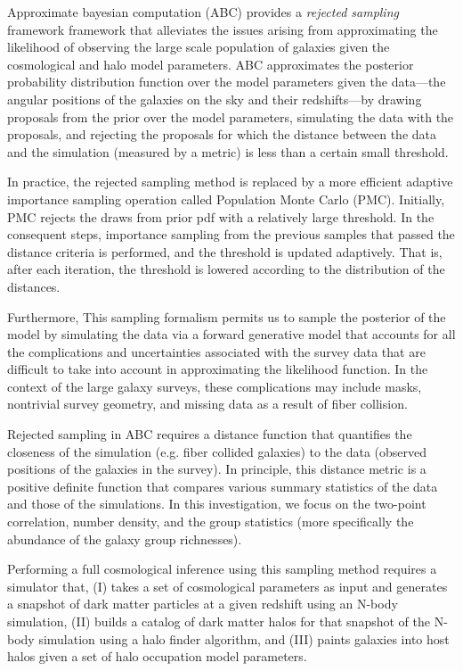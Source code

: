 Approximate bayesian computation (ABC) provides a \emph{rejected sampling} framework framework that alleviates the issues arising from approximating the likelihood of observing the large scale population of galaxies given the cosmological and halo model parameters. ABC approximates the posterior probability distribution function over the model parameters given the data---the angular positions of the galaxies on the sky and their redshifts---by drawing proposals from the prior over the model parameters, simulating the data with the proposals, and rejecting the proposals for which the distance between the data and the simulation (measured by a metric) is less than a certain small threshold.

In practice, the rejected sampling method is replaced by a more efficient adaptive importance sampling operation called Population Monte Carlo (PMC). Initially, PMC rejects the draws from prior pdf with a relatively large threshold. In the consequent steps, importance sampling from the previous samples that passed the distance criteria is performed, and the threshold is updated adaptively. That is, after each iteration, the threshold is lowered according to the distribution of the distances.  
 
Furthermore, This sampling formalism permits us to sample the posterior of the model by simulating the data via a forward generative model that accounts for all the complications and uncertainties associated with the survey data that are difficult to take into account in approximating the likelihood function. In the context of the large galaxy surveys, these complications may include masks, nontrivial survey geometry, and missing data as a result of fiber collision.

Rejected sampling in ABC requires a distance function that quantifies the closeness of the simulation (e.g. fiber collided galaxies) to the data (observed positions of the galaxies in the survey). In principle, this distance metric is a positive definite function  that compares various summary statistics of the data and those of the simulations. In this investigation, we focus on the two-point correlation, number density, and the group statistics (more specifically the abundance of the galaxy group richnesses). 

Performing a full cosmological inference using this sampling method requires a simulator that, (I) takes a set of cosmological parameters as input and generates a snapshot of dark matter particles at a given redshift using an N-body simulation, (II) builds a catalog of dark matter halos for that snapshot of the N-body simulation using a halo finder algorithm, and (III) paints galaxies into host halos given a set of halo occupation model parameters. 

